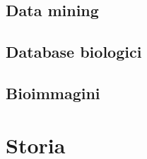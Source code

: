 \subsection{Data mining}
\subsection{Database biologici} %
\subsection{Bioimmagini}



\section{Storia}
